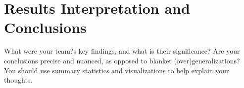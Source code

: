 \section{Results Interpretation and Conclusions}
\label{sec:results}
What were your team?s key findings, and what is
their significance? Are your conclusions precise and nuanced, as opposed to blanket
(over)generalizations? You should use summary statistics and visualizations to help
explain your thoughts.
